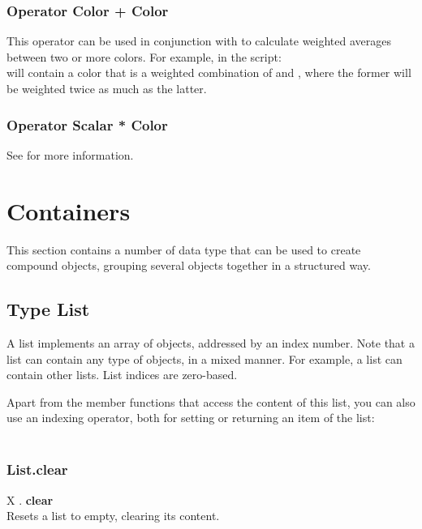\subsubsection{Operator Color + Color \label{O:Color+Color}}
This operator can be used in conjunction with  to calculate weighted averages between two or more colors.
For example, in the script: \\
will  contain a color that is a weighted combination of  and , where the former will be weighted twice as much as the latter.

\subsubsection{Operator Scalar * Color \label{O:Scalar*Color}}
See  for more information.

\section{Containers \label{Containers}}
This section contains a number of data type that can be used to create compound objects, grouping several objects together in a structured way.

\subsection{Type List \label{T:List}}
A list implements an array of objects, addressed by an index number. Note that a list can contain any type of objects, in a mixed manner. For example, a list can contain other lists. List indices are zero-based.

Apart from the member functions that access the content of this list, you can also use an indexing operator, both for setting or returning an item of the list: \\
 \\

\subsubsection{List.clear \label{F:List:clear}}
X . \textbf{clear} \\
Resets a list to empty, clearing its content.

